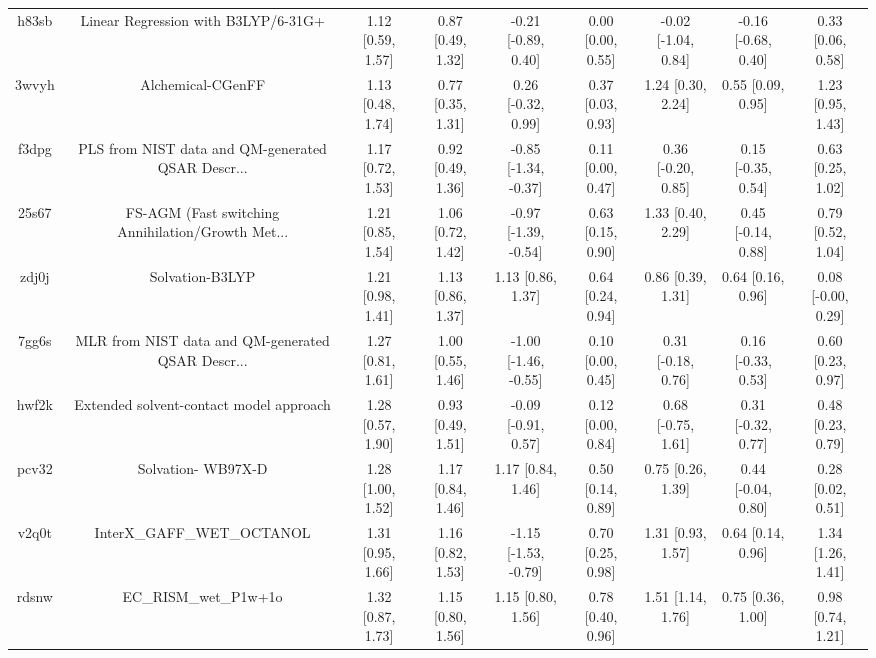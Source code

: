 \documentclass{article}
\begin{document}
\begin{center}
\begin{longtable}{|ccccccccc|}
 h83sb &                Linear Regression with B3LYP/6-31G+ &  1.12 [0.59, 1.57] &  0.87 [0.49, 1.32] &   -0.21 [-0.89, 0.40] &  0.00 [0.00, 0.55] &  -0.02 [-1.04, 0.84] &  -0.16 [-0.68, 0.40] &     0.33 [0.06, 0.58] \\
 3wvyh &                                  Alchemical-CGenFF &  1.13 [0.48, 1.74] &  0.77 [0.35, 1.31] &    0.26 [-0.32, 0.99] &  0.37 [0.03, 0.93] &    1.24 [0.30, 2.24] &    0.55 [0.09, 0.95] &     1.23 [0.95, 1.43] \\
 f3dpg &  PLS from NIST data and QM-generated QSAR Descr... &  1.17 [0.72, 1.53] &  0.92 [0.49, 1.36] &  -0.85 [-1.34, -0.37] &  0.11 [0.00, 0.47] &   0.36 [-0.20, 0.85] &   0.15 [-0.35, 0.54] &     0.63 [0.25, 1.02] \\
 25s67 &  FS-AGM (Fast switching Annihilation/Growth Met... &  1.21 [0.85, 1.54] &  1.06 [0.72, 1.42] &  -0.97 [-1.39, -0.54] &  0.63 [0.15, 0.90] &    1.33 [0.40, 2.29] &   0.45 [-0.14, 0.88] &     0.79 [0.52, 1.04] \\
 zdj0j &                                    Solvation-B3LYP &  1.21 [0.98, 1.41] &  1.13 [0.86, 1.37] &     1.13 [0.86, 1.37] &  0.64 [0.24, 0.94] &    0.86 [0.39, 1.31] &    0.64 [0.16, 0.96] &    0.08 [-0.00, 0.29] \\
 7gg6s &  MLR from NIST data and QM-generated QSAR Descr... &  1.27 [0.81, 1.61] &  1.00 [0.55, 1.46] &  -1.00 [-1.46, -0.55] &  0.10 [0.00, 0.45] &   0.31 [-0.18, 0.76] &   0.16 [-0.33, 0.53] &     0.60 [0.23, 0.97] \\
 hwf2k &            Extended solvent-contact model approach &  1.28 [0.57, 1.90] &  0.93 [0.49, 1.51] &   -0.09 [-0.91, 0.57] &  0.12 [0.00, 0.84] &   0.68 [-0.75, 1.61] &   0.31 [-0.32, 0.77] &     0.48 [0.23, 0.79] \\
 pcv32 &                                 Solvation- WB97X-D &  1.28 [1.00, 1.52] &  1.17 [0.84, 1.46] &     1.17 [0.84, 1.46] &  0.50 [0.14, 0.89] &    0.75 [0.26, 1.39] &   0.44 [-0.04, 0.80] &     0.28 [0.02, 0.51] \\
 v2q0t &                         InterX\_GAFF\_WET\_OCTANOL &  1.31 [0.95, 1.66] &  1.16 [0.82, 1.53] &  -1.15 [-1.53, -0.79] &  0.70 [0.25, 0.98] &    1.31 [0.93, 1.57] &    0.64 [0.14, 0.96] &     1.34 [1.26, 1.41] \\
 rdsnw &                              EC\_RISM\_wet\_P1w+1o &  1.32 [0.87, 1.73] &  1.15 [0.80, 1.56] &     1.15 [0.80, 1.56] &  0.78 [0.40, 0.96] &    1.51 [1.14, 1.76] &    0.75 [0.36, 1.00] &     0.98 [0.74, 1.21] \\

\end{longtable}
\end{center}
\end{document}
